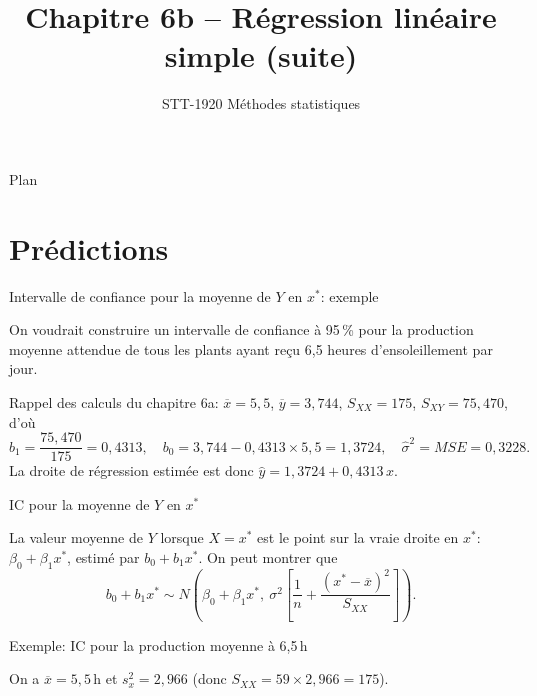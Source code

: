 \documentclass{BeamerTemplate}
\title{Chapitre 6b -- Régression linéaire simple (suite)}
\subtitle{STT-1920 Méthodes statistiques}
\date{}
\begin{document}
\begin{frame}[t]
  \titlepage
\end{frame}

\begin{frame}[t]{Plan}
\tableofcontents
\end{frame}

\section{Prédictions}

\begin{frame}[t]{Intervalle de confiance pour la moyenne de $Y$ en $x^*$: exemple}

On voudrait construire un intervalle de confiance à 95\,\% pour la
\alert{production moyenne} attendue de \alert{tous} les plants ayant reçu
6,5 heures d'ensoleillement par jour.

\medskip
\small
Rappel des calculs du chapitre 6a: $\overline{x}=5{,}5$, $\overline{y}=3{,}744$,
$S_{XX}=175$, $S_{XY}=75{,}470$, d'où
\[
b_1=\frac{75{,}470}{175}=0{,}4313,\quad b_0=3{,}744-0{,}4313\times5{,}5=1{,}3724,\quad
\hat\sigma^2=MSE=0{,}3228.
\]
La droite de régression estimée est donc $\hat y=1{,}3724+0{,}4313\,x$.

\end{frame}

\begin{frame}[t]{IC pour la moyenne de $Y$ en $x^*$}

La valeur moyenne de $Y$ lorsque $X=x^*$ est le point sur la vraie droite en
$x^*$: $\beta_0+\beta_1x^*$, estimé par $b_0+b_1x^*$. On peut montrer que
\[
b_0+b_1x^*\sim N\left(\beta_0+\beta_1x^*,\ \sigma^2\left[\frac1n
+\frac{(x^*-\overline{x})^2}{S_{XX}}\right]\right).
\]


\end{frame}

\begin{frame}[t]{Exemple: IC pour la production moyenne à 6,5\,h}

On a $\overline{x}=5{,}5$\,h et $s_x^2=2{,}966$ (donc $S_{XX}=59\times2{,}966=175$).

\vspace{5cm}

\end{frame}
\end{document}
